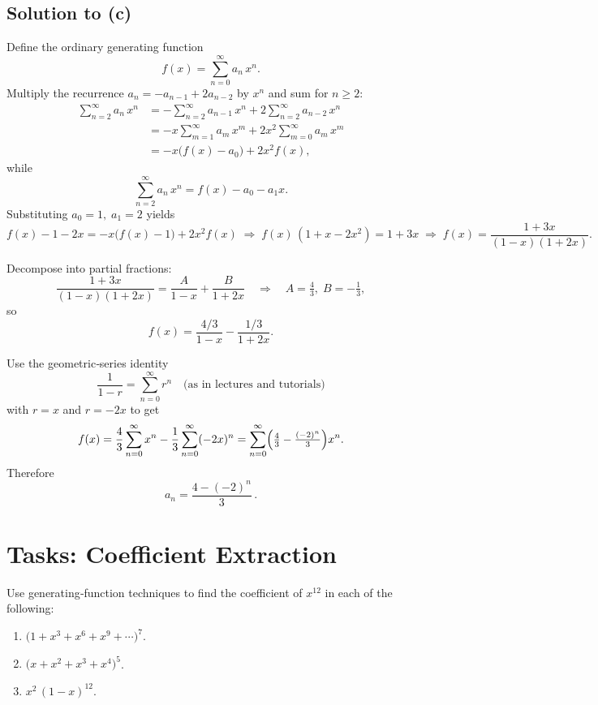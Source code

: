 \documentclass[docmute]{article}
\begin{document}
\subsection*{Solution to (c)}
Define the ordinary generating function
\[
f(x)=\sum_{n=0}^\infty a_n\,x^n.
\]
Multiply the recurrence \(a_n=-a_{n-1}+2a_{n-2}\) by \(x^n\) and sum for \(n\ge2\):
\begin{align*}
\sum_{n=2}^\infty a_n\,x^n
&=-\sum_{n=2}^\infty a_{n-1}\,x^n
+2\sum_{n=2}^\infty a_{n-2}\,x^n\\
&=-x\sum_{m=1}^\infty a_m\,x^m
+2x^2\sum_{m=0}^\infty a_m\,x^m\\
&=-x\bigl(f(x)-a_0\bigr)+2x^2f(x),
\end{align*}
while
\[
\sum_{n=2}^\infty a_n\,x^n=f(x)-a_0-a_1x.
\]
Substituting \(a_0=1,\;a_1=2\) yields
\[
f(x)-1-2x
=-x\bigl(f(x)-1\bigr)+2x^2f(x)
\;\Longrightarrow\;
f(x)\,(1+x-2x^2)=1+3x
\;\Longrightarrow\;
f(x)=\frac{1+3x}{(1-x)(1+2x)}.
\]

Decompose into partial fractions:
\[
\frac{1+3x}{(1-x)(1+2x)}
=\frac{A}{1-x}+\frac{B}{1+2x}
\quad\Longrightarrow\quad
A=\tfrac{4}{3},\;B=-\tfrac{1}{3},
\]
so
\[
f(x)
=\frac{4/3}{1-x}-\frac{1/3}{1+2x}.
\]

Use the geometric‐series identity
\[
\boxed{
\frac{1}{1-r}
=\sum_{n=0}^\infty r^n
\quad\text{(as in lectures and tutorials)}
}
\]
with \(r=x\) and \(r=-2x\) to get
\[
f(x)
=\frac{4}{3}\sum_{n=0}^\infty x^n
-\frac{1}{3}\sum_{n=0}^\infty(-2x)^n
=\sum_{n=0}^\infty\Bigl(\tfrac{4}{3}-\tfrac{(-2)^n}{3}\Bigr)x^n.
\]
Therefore
\[
\boxed{a_n=\frac{4-(-2)^n}{3}\,.}
\]


\section*{Tasks: Coefficient Extraction}

Use generating‐function techniques to find the coefficient of \(x^{12}\) in each of the following:
\begin{enumerate}[label=\textbf{(\alph*)}]
  \item \(\displaystyle\bigl(1 + x^3 + x^6 + x^9 + \cdots\bigr)^7\).
  \item \(\displaystyle\bigl(x + x^2 + x^3 + x^4\bigr)^5\).
  \item \(\displaystyle x^2\,(1 - x)^{12}\).
\end{enumerate}
\end{document}
